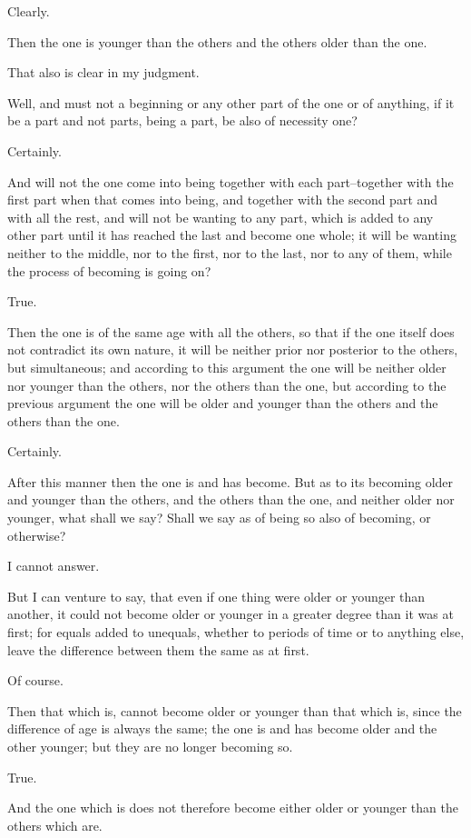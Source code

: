 Clearly.

Then the one is younger than the others and the others older than the
one.

That also is clear in my judgment.

Well, and must not a beginning or any other part of the one or of
anything, if it be a part and not parts, being a part, be also of
necessity one?

Certainly.

And will not the one come into being together with each part--together
with the first part when that comes into being, and together with the
second part and with all the rest, and will not be wanting to any part,
which is added to any other part until it has reached the last and
become one whole; it will be wanting neither to the middle, nor to
the first, nor to the last, nor to any of them, while the process of
becoming is going on?

True.

Then the one is of the same age with all the others, so that if the one
itself does not contradict its own nature, it will be neither prior
nor posterior to the others, but simultaneous; and according to this
argument the one will be neither older nor younger than the others, nor
the others than the one, but according to the previous argument the one
will be older and younger than the others and the others than the one.

Certainly.

After this manner then the one is and has become. But as to its becoming
older and younger than the others, and the others than the one, and
neither older nor younger, what shall we say? Shall we say as of being
so also of becoming, or otherwise?

I cannot answer.

But I can venture to say, that even if one thing were older or younger
than another, it could not become older or younger in a greater degree
than it was at first; for equals added to unequals, whether to periods
of time or to anything else, leave the difference between them the same
as at first.

Of course.

Then that which is, cannot become older or younger than that which
is, since the difference of age is always the same; the one is and has
become older and the other younger; but they are no longer becoming so.

True.

And the one which is does not therefore become either older or younger
than the others which are.


